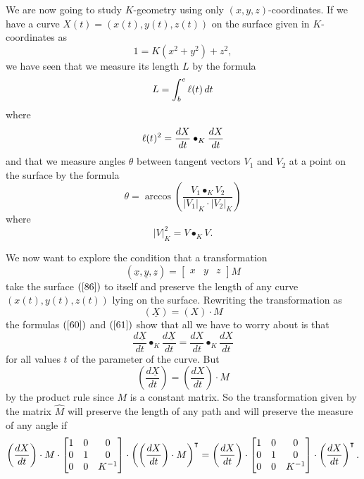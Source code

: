 \documentclass{ximera}
\begin{document}
We are now going to study $K$-geometry using only $\left( x,y,z\right)
$-coordinates. If we have a curve $X\left( t\right) =\left( x\left(
t\right) ,y\left( t\right) ,z\left( t\right) \right) $ on the surface
given in $K$-coordinates as%
\begin{equation}
1=K\left(  x^{2}+y^{2}\right)  +z^{2}, \label{86}%
\end{equation}
we have seen that we measure its length $L$ by the formula%
\begin{equation}
L= \int_{b}^{e}\l(t)\d t \label{60}%
\end{equation}
where
\begin{equation}
\l(t)^{2}=\frac{dX}{dt}\bullet_{K}\frac{dX}{dt} \label{61}%
\end{equation}
and that we measure angles $\theta$ between tangent vectors $V_{1}$ and
$V_{2}$ at a point on the surface by the formula%
\[
\theta=\arccos\left(  \frac{V_{1}\bullet_{K}V_{2}}{\left\vert
V_{1}\right\vert _{K}\cdot\left\vert V_{2}\right\vert
_{K}}\right)
\]
where%
\[
\left\vert V\right\vert _{K}^{2}=V\bullet_{K}V.
\]


We now want to explore the condition that a transformation%
\[
\left(  \underline{x},\underline{y},\underline{z}\right)  =
\begin{bmatrix}
x & y & z
\end{bmatrix}M
\]
take the surface $\left( \ref{86}\right) $ to itself and preserve the
length of any curve $\left( x\left( t\right) ,y\left( t\right)
,z\left( t\right) \right) $ lying on the surface. Rewriting the
transformation as%
\[
\left( \underline{X}\right) =\left( X\right) \cdot M
\]
the formulas $\left(  \ref{60}\right)  $ and $\left(  \ref{61}\right)  $ show
that all we have to worry about is that%
\[
\frac{d\underline{X}}{dt}\bullet_{K}\frac{d\underline{X}}{dt}=\frac{dX}%
{dt}\bullet_{K}\frac{dX}{dt}%
\]
for all values $t$ of the parameter of the curve. But%
\[
\left(  \frac{d\underline{X}}{dt}\right)  =\left(  \frac{dX}{dt}\right)  \cdot
M
\]
by the product rule since $M$ is a constant matrix. So the transformation
given by the matrix $\hat{M}$ will preserve the length of any path and will
preserve the measure of any angle if%
\begin{equation}
\left(  \frac{dX}{dt}\right)  \cdot M\cdot\begin{bmatrix}
1 & 0 & 0\\
0 & 1 & 0\\
0 & 0 & K^{-1}%
\end{bmatrix}
\cdot\left(  \left(  \frac{dX}{dt}\right)  \cdot M\right)
^\transpose=\left(  \frac{dX}{dt}\right)  \cdot
\begin{bmatrix}
1 & 0 & 0\\
0 & 1 & 0\\
0 & 0 & K^{-1}%
\end{bmatrix}
\cdot\left(  \frac{dX}{dt}\right)  ^\transpose. \label{89}%
\end{equation}
\end{document}
